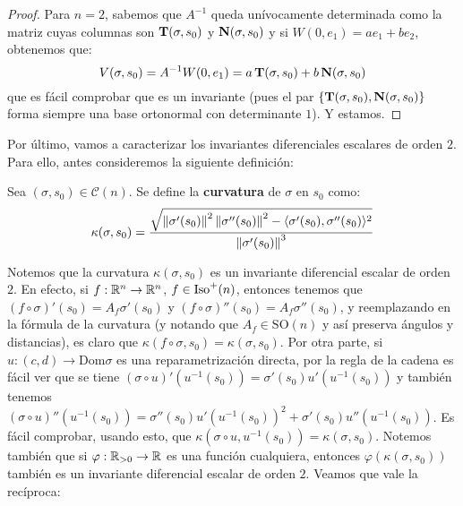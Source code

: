 \begin{prop}
\begin{proof}
Para $n=2$, sabemos que $A^{-1}$ queda unívocamente determinada como la matriz cuyas columnas son $\operatorname{\mathbf{T}}(\sigma,s_0)$ y $\operatorname{\mathbf{N}}(\sigma,s_0)$ y si $W(0,e_1)=ae_1 + be_2$, obtenemos que: $$V(\sigma,s_0)=A^{-1}W(0,e_1) = a\operatorname{\mathbf{T}}(\sigma,s_0)+b\operatorname{\mathbf{N}}(\sigma,s_0)$$ que es fácil comprobar que es un invariante (pues el par $\{\operatorname{\mathbf{T}}(\sigma,s_0),\operatorname{\mathbf{N}}(\sigma,s_0)\}$ forma siempre una base ortonormal con determinante $1$). Y estamos.
\end{proof}
\end{prop}

Por último, vamos a caracterizar los invariantes diferenciales escalares de orden $2$. Para ello, antes consideremos la siguiente definición:

\begin{defn}
Sea $(\sigma,s_0)\in\mathscr{C}(n)$. Se define la \textbf{curvatura} de $\sigma$ en $s_0$ como: $$\kappa(\sigma,s_0)=\dfrac{\sqrt{\left\| \sigma'(s_0) \right\|^2\left\| \sigma''(s_0) \right\|^2 - \langle\sigma'(s_0),\sigma''(s_0)\rangle^2}}{\left\| \sigma'(s_0) \right\|^3}$$
\end{defn}

Notemos que la curvatura $\kappa(\sigma,s_0)$ es un invariante diferencial escalar de orden $2$. En efecto, si $f:\mathbb{R}^n\to\mathbb{R}^n$, $f\in\operatorname{Iso}^+(n)$, entonces tenemos que $(f\circ\sigma)'(s_0)=A_f\sigma'(s_0)$ y $(f\circ\sigma)''(s_0)=A_f\sigma''(s_0)$, y reemplazando en la fórmula de la curvatura (y notando que $A_f\in\mathrm{SO}(n)$ y así preserva ángulos y distancias), es claro que $\kappa(f\circ\sigma,s_0)=\kappa(\sigma,s_0)$. Por otra parte, si $u:(c,d)\to\mathrm{Dom}\sigma$ es una reparametrización directa, por la regla de la cadena es fácil ver que se tiene $(\sigma\circ u)'(u^{-1}(s_0)) = \sigma'(s_0)u'(u^{-1}(s_0))$ y también tenemos $(\sigma\circ u)''(u^{-1}(s_0)) = \sigma''(s_0) u'(u^{-1}(s_0))^2 + \sigma'(s_0)u''(u^{-1}(s_0))$. Es fácil comprobar, usando esto, que $\kappa(\sigma\circ u,u^{-1}(s_0)) = \kappa(\sigma,s_0)$. Notemos también que si $\varphi:\mathbb{R}_{>0}\to\mathbb{R}$ es una función cualquiera, entonces $\varphi(\kappa(\sigma,s_0))$ también es un invariante diferencial escalar de orden $2$. Veamos que vale la recíproca:

